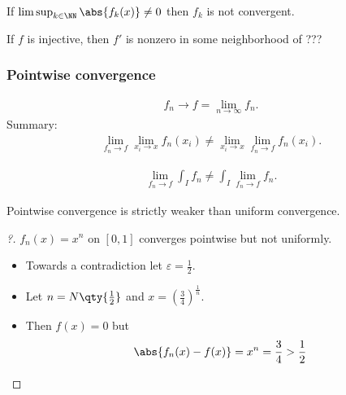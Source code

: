 \begin{proposition}[?]

If \(\limsup_{k\in \NN} \abs{f_k(x)} \neq 0\) then \(f_k\) is not
convergent.

\end{proposition}

\begin{proposition}[?]

If \(f\) is injective, then \(f'\) is nonzero in some neighborhood of
???

\end{proposition}

\hypertarget{pointwise-convergence}{%
\subsubsection{Pointwise convergence}\label{pointwise-convergence}}

\begin{align*}  
f_n \to f = \lim_{n\to\infty} f_n
.\end{align*} Summary:
\begin{align*}  
\lim_{f_n \to f} \lim_{x_i \to x} f_n(x_i) \neq \lim_{x_i \to x} \lim_{f_n \to f} f_n(x_i)
.\end{align*}

\begin{align*}  
\lim_{f_n \to f} \int_I f_n \neq \int_I \lim_{f_n \to f} f_n
.\end{align*}

\begin{proposition}[?]

Pointwise convergence is strictly weaker than uniform convergence.

\end{proposition}

\begin{proof}[?]

\(f_n(x) = x^n\) on \([0, 1]\) converges pointwise but not uniformly.

\begin{itemize}
\tightlist
\item
  Towards a contradiction let \(\varepsilon = \frac{1}{2}\).
\item
  Let \(n = N\qty{\frac{1}{2} }\) and
  \(x = \left(\frac{3}{4}\right)^\frac{1}{n}\).
\item
  Then \(f(x) = 0\) but
  \begin{align*}
  \abs{f_n(x) - f(x)} = x^n = \frac{3}{4} > \frac{1}{2}
  \end{align*}
\end{itemize}

\end{proof}

